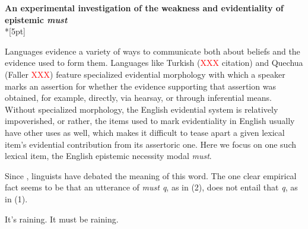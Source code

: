\documentclass[11pt]{article}
\newcommand{\red}[1]{\textcolor{Red}{#1}}
\begin{document}
\begin{center}\textbf{An experimental investigation of the weakness and evidentiality of epistemic \emph{must}}\\*[5pt]
\end{center}

\vspace{-11pt}


Languages evidence a variety of ways to communicate both about beliefs and the evidence used to form them. Languages like Turkish (\red{XXX} citation) and Quechua (Faller \red{XXX}) feature specialized evidential morphology with which a speaker marks an assertion for whether the evidence supporting that assertion was obtained, for example, directly, via hearsay, or through inferential means. Without specialized morphology, the English evidential system is relatively impoverished, or rather, the items used to mark evidentiality in English usually have other uses as well, which makes it difficult to tease apart a given lexical item's evidential contribution from its assertoric one. Here we focus on one such lexical item, the English epistemic necessity modal \emph{must}.

Since , linguists have debated the meaning of this word. The one clear empirical fact seems to be that an utterance of \emph{must q}, as in (2), does not entail that \emph{q}, as in (1). 


\vspace{-8pt}
\begin{exe}
\ex\label{inference} 
\begin{xlist}
\ex\label{bare}  It's raining.
\ex\label{must} It must be raining.
\end{xlist}
\end{exe}
\vspace{-8pt}
\end{document}
